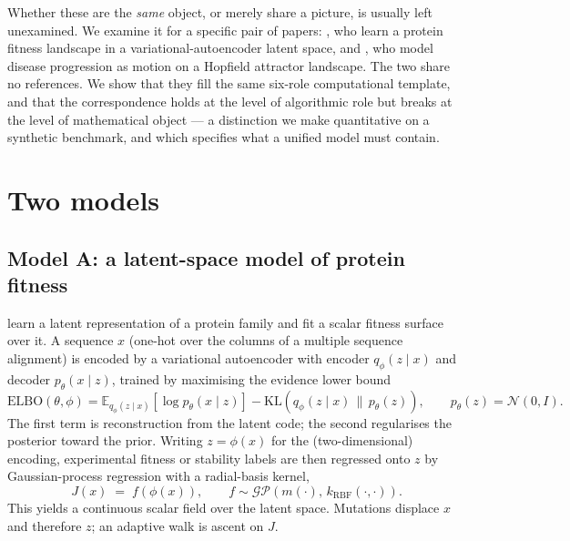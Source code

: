 \documentclass[11pt]{article}
\begin{document}
Whether these are the \emph{same} object, or merely share a picture, is usually left unexamined. We examine it for a
specific pair of papers: \citet{ding2019latent}, who learn a protein fitness landscape in a variational-autoencoder
latent space, and \citet{fard2017attractor}, who model disease progression as motion on a Hopfield attractor
landscape. The two share no references. We show that they fill the same six-role computational template, and that
the correspondence holds at the level of algorithmic role but breaks at the level of mathematical object --- a
distinction we make quantitative on a synthetic benchmark, and which specifies what a unified model must contain.

\section{Two models}

\subsection{Model A: a latent-space model of protein fitness}
\citet{ding2019latent} learn a latent representation of a protein family and fit a scalar fitness surface over it.
A sequence $x$ (one-hot over the columns of a multiple sequence alignment) is encoded by a variational autoencoder
\citep{kingma2014vae} with encoder $q_\phi(z\mid x)$ and decoder $p_\theta(x\mid z)$, trained by maximising the
evidence lower bound
\begin{equation}
\mathrm{ELBO}(\theta,\phi)=\mathbb{E}_{q_\phi(z\mid x)}\!\left[\log p_\theta(x\mid z)\right]
-\mathrm{KL}\!\left(q_\phi(z\mid x)\,\|\,p_\theta(z)\right),
\qquad p_\theta(z)=\mathcal{N}(0,I).
\label{eq:elbo}
\end{equation}
The first term is reconstruction from the latent code; the second regularises the posterior toward the prior.
Writing $z=\phi(x)$ for the (two-dimensional) encoding, experimental fitness or stability labels are then regressed
onto $z$ by Gaussian-process regression \citep{rasmussen2006gp} with a radial-basis kernel,
\begin{equation}
J(x) \;=\; f\!\left(\phi(x)\right), \qquad f \sim \mathcal{GP}\!\left(m(\cdot),\,k_{\mathrm{RBF}}(\cdot,\cdot)\right).
\label{eq:gp}
\end{equation}
This yields a continuous scalar field over the latent space. Mutations displace $x$ and therefore $z$; an adaptive
walk is ascent on $J$.
\end{document}
